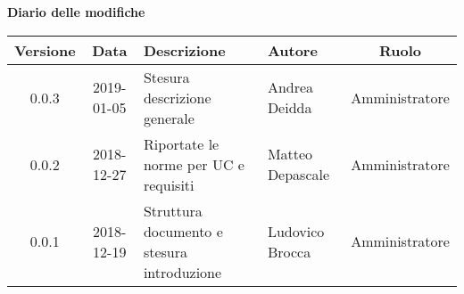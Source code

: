 	\begin{center}
		\textbf{Diario delle modifiche}
	\end{center}
	\begin{center}
		\begin{tabularx}{\textwidth}{|c|c|X|X|c|}
			\hline
			\textbf{Versione} & \textbf{Data} & \textbf{Descrizione} & \textbf{Autore} & \textbf{Ruolo} \\
			\hline
			0.0.3 & 2019-01-05 & Stesura descrizione generale& Andrea Deidda & Amministratore\\
			\hline
			0.0.2 & 2018-12-27 & Riportate le norme per UC e requisiti& Matteo Depascale & Amministratore\\
			\hline
			0.0.1 & 2018-12-19 & Struttura documento e stesura introduzione& Ludovico Brocca & Amministratore\\
			\hline
		\end{tabularx}
	\end{center}
\newpage